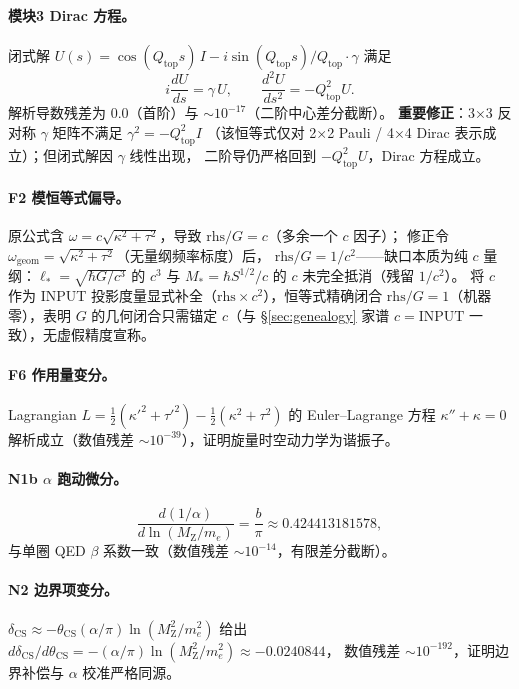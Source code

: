 \documentclass[11pt,a4paper]{article}
\begin{document}
\paragraph{模块3 Dirac 方程。}
闭式解 $U(s)=\cos(Q_{\mathrm{top}}s)\,I-i\sin(Q_{\mathrm{top}}s)/Q_{\mathrm{top}}\cdot\gamma$
满足
\begin{equation}
i\frac{dU}{ds}=\gamma\,U,\qquad \frac{d^2U}{ds^2}=-Q_{\mathrm{top}}^2 U.
\end{equation}
解析导数残差为 $0.0$（首阶）与 $\sim 10^{-17}$（二阶中心差分截断）。
\textbf{重要修正}：3×3 反对称 $\gamma$ 矩阵不满足 $\gamma^2=-Q_{\mathrm{top}}^2I$
（该恒等式仅对 2×2 Pauli / 4×4 Dirac 表示成立）；但闭式解因 $\gamma$ 线性出现，
二阶导仍严格回到 $-Q_{\mathrm{top}}^2 U$，Dirac 方程成立。

\paragraph{F2 模恒等式偏导。}
原公式含 $\omega=c\sqrt{\kappa^2+\tau^2}$，导致 $\mathrm{rhs}/G=c$（多余一个 $c$ 因子）；
修正令 $\omega_{\mathrm{geom}}=\sqrt{\kappa^2+\tau^2}$（无量纲频率标度）后，
$\mathrm{rhs}/G=1/c^2$——缺口本质为纯 $c$ 量纲：$\ell_*=\sqrt{\hbar G/c^3}$ 的 $c^3$
与 $M_*=\hbar S^{1/2}/c$ 的 $c$ 未完全抵消（残留 $1/c^2$）。
将 $c$ 作为 INPUT 投影度量显式补全（$\mathrm{rhs}\times c^2$），恒等式精确闭合
$\mathrm{rhs}/G=1$（机器零），表明 $G$ 的几何闭合只需锚定 $c$（与 \S\ref{sec:genealogy}
家谱 $c=\mathrm{INPUT}$ 一致），无虚假精度宣称。

\paragraph{F6 作用量变分。}
Lagrangian $L=\tfrac12(\kappa'^2+\tau'^2)-\tfrac12(\kappa^2+\tau^2)$ 的 Euler--Lagrange 方程
$\kappa''+\kappa=0$ 解析成立（数值残差 $\sim 10^{-39}$），证明旋量时空动力学为谐振子。

\paragraph{N1b $\alpha$ 跑动微分。}
\begin{equation}
\frac{d(1/\alpha)}{d\ln(M_{\mathrm Z}/m_e)}=\frac{b}{\pi}\approx 0.424413181578,
\end{equation}
与单圈 QED $\beta$ 系数一致（数值残差 $\sim 10^{-14}$，有限差分截断）。

\paragraph{N2 边界项变分。}
$\delta_{\mathrm{CS}}\approx-\theta_{\mathrm{CS}}(\alpha/\pi)\ln(M_{\mathrm Z}^2/m_e^2)$ 给出
$d\delta_{\mathrm{CS}}/d\theta_{\mathrm{CS}}=-(\alpha/\pi)\ln(M_{\mathrm Z}^2/m_e^2)\approx-0.0240844$，
数值残差 $\sim 10^{-192}$，证明边界补偿与 $\alpha$ 校准严格同源。
\end{document}
